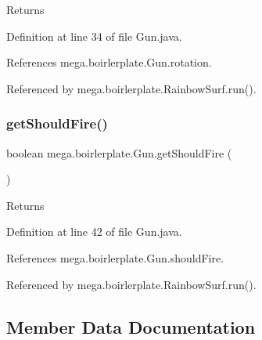 \begin{DoxyReturn}{Returns}

\end{DoxyReturn}


Definition at line 34 of file Gun.\+java.



References mega.\+boirlerplate.\+Gun.\+rotation.



Referenced by mega.\+boirlerplate.\+Rainbow\+Surf.\+run().

\mbox{\label{classmega_1_1boirlerplate_1_1_gun_ad920c032dd47ee1a80635f7fcb71e47c}} 
\subsubsection{\texorpdfstring{get\+Should\+Fire()}{getShouldFire()}}
{\footnotesize\ttfamily boolean mega.\+boirlerplate.\+Gun.\+get\+Should\+Fire (\begin{DoxyParamCaption}{ }\end{DoxyParamCaption})}

\begin{DoxyReturn}{Returns}

\end{DoxyReturn}


Definition at line 42 of file Gun.\+java.



References mega.\+boirlerplate.\+Gun.\+should\+Fire.



Referenced by mega.\+boirlerplate.\+Rainbow\+Surf.\+run().



\subsection{Member Data Documentation}
\mbox{\label{classmega_1_1boirlerplate_1_1_gun_a874ce5b2384de7ee92c67d56c60fa083}} 
